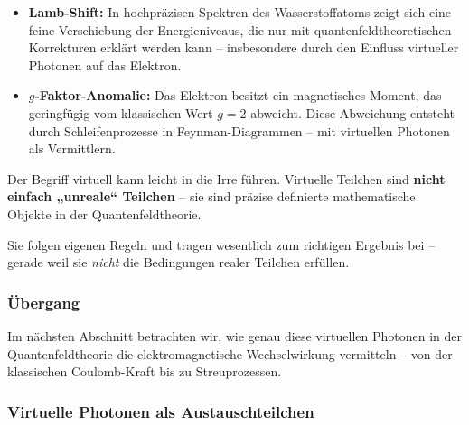 \medskip
\begin{tcolorbox}[hinweisbox, title=Indirekte Nachweise virtueller Photonen]
	\label{box:Nachweis virtueller Photonen}
	\small
	\begin{itemize}
		\item \textbf{Lamb-Shift:} In hochpräzisen Spektren des Wasserstoffatoms zeigt sich eine feine Verschiebung der Energieniveaus, die nur mit quantenfeldtheoretischen Korrekturen erklärt werden kann – insbesondere durch den Einfluss virtueller Photonen auf das Elektron.
		\item \textbf{$g$-Faktor-Anomalie:} Das Elektron besitzt ein magnetisches Moment, das geringfügig vom klassischen Wert $g = 2$ abweicht. Diese Abweichung entsteht durch Schleifenprozesse in Feynman-Diagrammen – mit virtuellen Photonen als Vermittlern.
	\end{itemize}
\end{tcolorbox}

\medskip
\begin{tcolorbox}[didaktikbox, title=Virtuell heißt nicht: weniger real?, label=box:virtuell-denkfehler]
	\label{box:virtuell-denkfehler}
	Der Begriff \glqq virtuell\grqq{} kann leicht in die Irre führen. Virtuelle Teilchen sind \textbf{nicht einfach „unreale“ Teilchen} – sie sind präzise definierte mathematische Objekte in der Quantenfeldtheorie.
	
	Sie folgen eigenen Regeln und tragen wesentlich zum richtigen Ergebnis bei – gerade weil sie \emph{nicht} die Bedingungen realer Teilchen erfüllen.
\end{tcolorbox}


\medskip

\subsubsection*{Übergang}

Im nächsten Abschnitt betrachten wir, wie genau diese virtuellen Photonen in der Quantenfeldtheorie die elektromagnetische Wechselwirkung vermitteln – von der klassischen Coulomb-Kraft bis zu Streuprozessen.
\subsubsection{Virtuelle Photonen als Austauschteilchen}

